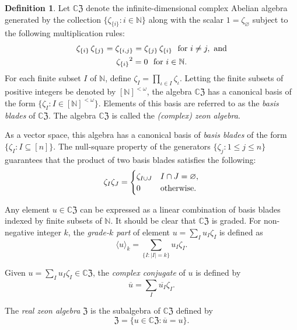 \documentclass{article}
\theoremstyle{definition}
\newtheorem{definition}[theorem]{Definition}
\newcommand{\CZ}{\mathbb{C}\mathfrak{Z}}
\newcommand{\Z}{\mathfrak{Z}}
\numberwithin{equation}{section}
\begin{document}
\begin{definition}
Let $\CZ$ denote the infinite-dimensional complex Abelian algebra generated by the collection $\{\zeta_{\{i\}}: i\in \mathbb{N}\}$ along with the scalar $1=\zeta_\varnothing$ subject to the following multiplication rules:
\begin{gather*}
\zeta_{\{i\}}\,\zeta_{\{j\}}=\zeta_{\{i,j\}}=\zeta_{\{j\}}\,\zeta_{\{i\}}\,\,\text{ \rm
for }i\ne j,\text{ \rm and}\\
{\zeta_{\{i\}}}^2=0\,\,\text{ \rm for }i\in \mathbb{N}.
\end{gather*}
For each finite subset $I$ of $\mathbb{N}$, define $\displaystyle\zeta_{I}=\prod_{\iota\in I}\zeta_\iota$.  Letting the finite subsets of positive integers be denoted by $[\mathbb{N}]^{<\omega}$, the algebra $\CZ$ has a canonical basis of the form $\{\zeta_I: I\in [\mathbb{N}]^{<\omega}\}$.   Elements of this basis are referred to as the {\em basis blades} of $\CZ$.   The algebra $\CZ$ is called the  {\em (complex) zeon algebra}.
\end{definition}

As a vector space, this algebra has a canonical basis of  {\em basis blades} of the form $\{\zeta_I: I\subseteq [n]\}$.  The null-square property of the generators $\{\zeta_j:1\le j\le n\}$ guarantees that the product of two basis blades satisfies the following:\begin{equation}\label{blade product}
\zeta_I\zeta_J=\begin{cases}
\zeta_{I\cup J}& I\cap J=\varnothing,\\
0&\text{\rm otherwise.}
\end{cases}
\end{equation}

Any element $u\in\CZ$ can be expressed as a linear combination of basis blades indexed by finite subsets of $\mathbb{N}$.   It should be clear that $\CZ$ is graded.  For non-negative integer $k$, the {\em grade-$k$ part} of element $u=\sum_I u_I\zeta_I$ is defined as \begin{equation*}
\langle u\rangle_k=\sum_{\{I:|I|=k\}}u_I\zeta_I.
\end{equation*}

Given  $u=\sum_I u_I\zeta_I\in\CZ$, the {\em complex conjugate} of $u$ is defined by \begin{equation*}
\overline{u}=\sum_I \overline{u_I}\zeta_I.
\end{equation*}

The {\em real zeon algebra} $\Z$ is the subalgebra of $\CZ$ defined by \begin{equation*}
\Z=\{u\in\CZ: \overline{u}=u\}.
\end{equation*}  
\end{document}

